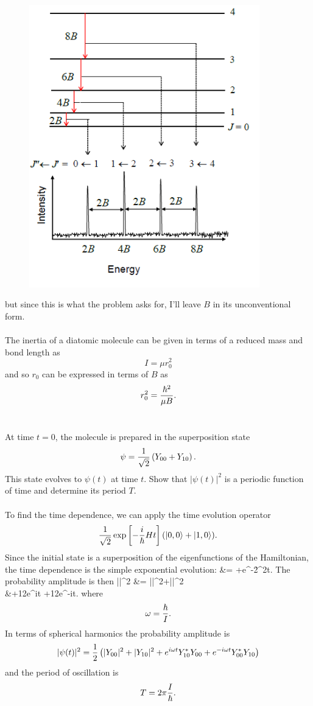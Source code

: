 \documentclass[11pt,letterpaper]{article}
\begin{document}
		\begin{figure}[H]
		\centering
		\includegraphics[width=100mm]{1_HW5.png}
		\end{figure}
		
		but since this is what the problem
		asks for, I'll leave $B$ in its unconventional form. 
		\\
		\\
		The inertia of a diatomic molecule can be given in terms of a reduced mass and bond length as
		\[
			I = \mu r_0^2
		\]
		and so $r_0$ can be expressed in terms of $B$ as
		\[
			r_0^2 = \frac{\hbar^2}{\mu B}.
		\]
		\\
		\item
		At time $t=0$, the molecule is prepared in the superposition state 
		\[
			\psi = \frac{1}{\sqrt 2}\left(Y_{00}+Y_{10}\right).
		\]
		This state evolves to $\psi(t)$ at time $t$. Show that $|\psi(t)|^2$ is a periodic function of time and determine its
		period $T$. 
		\\
		\\
		To find the time dependence, we can apply the time evolution operator 
		\[
			\frac{1}{\sqrt 2}\exp\left[-\frac i{\hbar} Ht\right](\ket{0,0}+\ket{1,0}).
		\]
		Since the initial state is a superposition of the eigenfunctions of the Hamiltonian, the time dependence is the simple
		exponential evolution:
		\ba
			 &=  +e^{-2\h^2t}.
		\ea
		The probability amplitude is then
		\ba
			||^2 &= ||^2+||^2\\
			&\quad+\frac 12e^{i\omega t}
			+\frac 12e^{-i\omega t}.
		\ea
		where 
		\[
			\omega = \frac{\hbar}{I} .
		\]
		In terms of spherical harmonics the probability amplitude is
		\[
			|\psi(t)|^2 = \frac{1}{2}\left(|Y_{00}|^2+|Y_{10}|^2+e^{i\omega t}Y^*_{10}Y_{00}+e^{-i\omega t}
			Y^*_{00}Y_{10}\right)
		\]
		and the period of oscillation is
		\[
			T = 2\pi\frac{I}{\hbar}.
		\]
		\\
		\eenum
		
\end{document}
